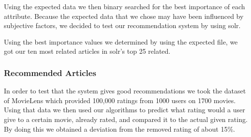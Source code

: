 Using the expected data we then binary searched for the best importance of each attribute.
Because the expected data that we chose may have been influenced by subjective factors, we decided to test our recommendation system by using solr.

Using the best importance values we determined by using the expected file, we got our ten most related articles in solr's top 25 related.

\subsubsection{Recommended Articles}
\label{sec:recommended-articles}
In order to test that the system gives good recommendations we took the dataset of MovieLens which provided 100,000 ratings from 1000 users on 1700 movies. Using that data we then used our algorithms to predict what rating would a user give to a certain movie, already rated, and compared it to the actual given rating. By doing this we obtained a deviation from the removed rating of about 15\%.
